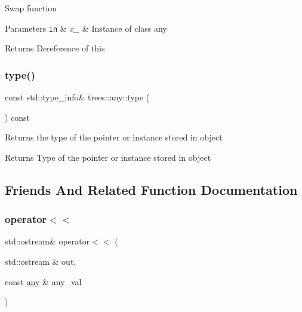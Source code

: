 Swap function


\begin{DoxyParams}[1]{Parameters}
\mbox{\tt in}  & {\em x\+\_\+} & Instance of class any \\
\hline
\end{DoxyParams}
\begin{DoxyReturn}{Returns}
Dereference of this 
\end{DoxyReturn}
\mbox{\label{classtrees_1_1any_a12c9cf25286af6afcb4891d8bbd5b2fa}} 
\subsubsection{\texorpdfstring{type()}{type()}}
{\footnotesize\ttfamily const std\+::type\+\_\+info\& trees\+::any\+::type (\begin{DoxyParamCaption}{ }\end{DoxyParamCaption}) const\hspace{0.3cm}{\ttfamily [inline]}}

Returns the type of the pointer or instance stored in object

\begin{DoxyReturn}{Returns}
Type of the pointer or instance stored in object 
\end{DoxyReturn}


\subsection{Friends And Related Function Documentation}
\mbox{\label{classtrees_1_1any_a2987b17b8a128cbefb105ed12f5b8f92}} 
\subsubsection{\texorpdfstring{operator$<$$<$}{operator<<}}
{\footnotesize\ttfamily std\+::ostream\& operator$<$$<$ (\begin{DoxyParamCaption}\item[{std\+::ostream \&}]{out,  }\item[{const \hyperlink{classtrees_1_1any}{any} \&}]{any\+\_\+val }\end{DoxyParamCaption})\hspace{0.3cm}{\ttfamily [friend]}}

